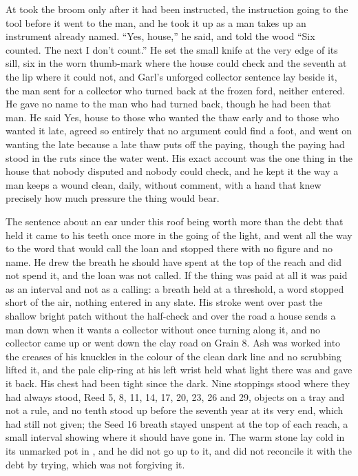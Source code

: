 \scenebreak

At   took the broom only after it had been instructed, the instruction going to the tool before it went to the man, and he took it up as a man takes up an instrument already named. “Yes, house,” he said, and told the wood “Six counted. The next I don't count.” He set the small knife at the very edge of its sill, six in the worn thumb-mark where the house could check and the seventh at the lip where it could not, and Garl's unforged collector sentence lay beside it, the man sent for a collector who turned back at the frozen ford, neither entered. He gave no name to the man who had turned back, though he had been that man. He said Yes, house to those who wanted the thaw early and to those who wanted it late, agreed so entirely that no argument could find a foot, and went on wanting the late because a late thaw puts off the paying, though the paying had stood in the ruts since the water went. His exact account was the one thing in the house that nobody disputed and nobody could check, and he kept it the way a man keeps a wound clean, daily, without comment, with a hand that knew precisely how much pressure the thing would bear.

The sentence about an ear under this roof being worth more than the debt that held it came to his teeth once more in the going of the light, and went all the way to the word that would call the loan and stopped there with no figure and no name. He drew the breath he should have spent at the top of the reach and did not spend it, and the loan was not called. If the thing was paid at all it was paid as an interval and not as a calling: a breath held at a threshold, a word stopped short of the air, nothing entered in any slate. His stroke went over  past the shallow bright patch without the half-check and over the road a house sends a man down when it wants a collector without once turning along it, and no collector came up or went down the clay road on Grain 8. Ash was worked into the creases of his knuckles in the colour of the clean dark line and no scrubbing lifted it, and the pale clip-ring at his left wrist held what light there was and gave it back. His chest had been tight since the dark. Nine stoppings stood where they had always stood, Reed 5, 8, 11, 14, 17, 20, 23, 26 and 29, objects on a tray and not a rule, and no tenth stood up before the seventh year at its very end, which had still not given; the Seed 16 breath stayed unspent at the top of each reach, a small interval showing where it should have gone in. The warm stone lay cold in its unmarked pot in , and he did not go up to it, and did not reconcile it with the debt by trying, which was not forgiving it.

